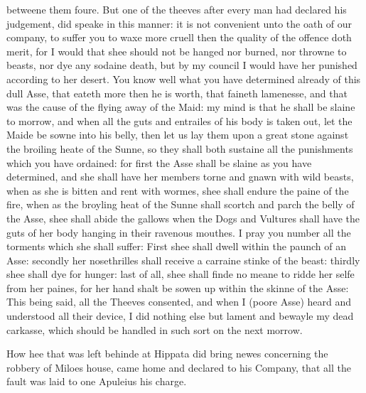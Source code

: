 betweene them foure. But one of the theeves after every man had declared his
judgement, did speake in this manner: it is not convenient unto the oath of our
company, to suffer you to waxe more cruell then the quality of the offence doth
merit, for I would that shee should not be hanged nor burned, nor throwne to
beasts, nor dye any sodaine death, but by my council I would have her punished
according to her desert. You know well what you have determined already of this
dull Asse, that eateth more then he is worth, that faineth lamenesse, and that
was the cause of the flying away of the Maid: my mind is that he shall be
slaine to morrow, and when all the guts and entrailes of his body is taken out,
let the Maide be sowne into his belly, then let us lay them upon a great stone
against the broiling heate of the Sunne, so they shall both sustaine all the
punishments which you have ordained: for first the Asse shall be slaine as you
have determined, and she shall have her members torne and gnawn with wild
beasts, when as she is bitten and rent with wormes, shee shall endure the paine
of the fire, when as the broyling heat of the Sunne shall scortch and parch the
belly of the Asse, shee shall abide the gallows when the Dogs and Vultures
shall have the guts of her body hanging in their ravenous mouthes. I pray you
number all the torments which she shall suffer: First shee shall dwell within
the paunch of an Asse: secondly her nosethrilles shall receive a carraine
stinke of the beast: thirdly shee shall dye for hunger: last of all, shee shall
finde no meane to ridde her selfe from her paines, for her hand shalt be sowen
up within the skinne of the Asse: This being said, all the Theeves consented,
and when I (poore Asse) heard and understood all their device, I did nothing
else but lament and bewayle my dead carkasse, which should be handled in such
sort on the next morrow.



How hee that was left behinde at Hippata did bring newes concerning the robbery
of Miloes house, came home and declared to his Company, that all the fault was
laid to one Apuleius his charge.

